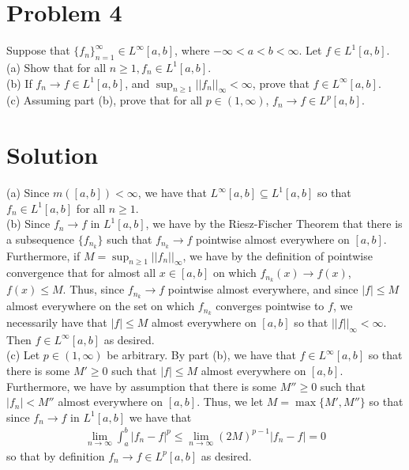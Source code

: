 \documentclass{article}
\begin{document}
\section*{Problem 4}
Suppose that $\{f_n\}_{n=1}^\infty\in L^\infty[a,b]$, where $-\infty<a<b<\infty$. Let $f\in L^1[a,b]$.\\

\noindent (a) Show that for all $n\geq 1, f_n\in L^1[a,b]$.\\

\noindent (b) If $f_n\rightarrow f\in L^1[a,b]$, and $\sup_{n\geq 1}||f_n||_\infty<\infty$, prove that
$f\in L^\infty[a,b]$.\\

\noindent (c) Assuming part (b), prove that for all $p\in(1,\infty)$, $f_n\rightarrow f\in L^p[a,b]$.

\section*{Solution}
(a) Since $m([a,b])<\infty$, we have that $L^\infty[a,b]\subseteq L^1[a,b]$ so that $f_n\in L^1[a,b]$ for all $n\geq 1$.\\

\noindent (b) Since $f_n\rightarrow f$ in $L^1[a,b]$, we have by the Riesz-Fischer Theorem that there is a subsequence $\{f_{n_k}\}$ such that $f_{n_k}\rightarrow f$ pointwise almost everywhere on $[a,b]$.  Furthermore, if $M=\sup_{n\geq 1}||f_n||_\infty$, we have by the definition of pointwise convergence that for almost all $x\in[a,b]$ on which $f_{n_k}(x)\rightarrow f(x)$, $f(x)\leq M$.  Thus, since $f_{n_k}
\rightarrow f$ pointwise almost everywhere, and since $|f|\leq M$ almost everywhere on the set on which $f_{n_k}$ converges pointwise to $f$, we necessarily have that $|f|\leq M$ almost everywhere on $[a,b]$ so that $||f||_\infty<\infty$.  Then $f\in L^\infty[a,b]$ as desired.\\

\noindent (c) Let $p\in(1,\infty)$ be arbitrary.  By part (b), we have that $f\in L^\infty[a,b]$ so that there is some $M'\geq 0$ such that $|f|\leq M$ almost everywhere on $[a,b]$.  Furthermore, we have by assumption that there is some $M''\geq 0$ such that $|f_n|<M''$ almost everywhere on $[a,b]$.  Thus, we let $M=\max\{M',M''\}$ so that since $f_n\rightarrow f$ in $L^1[a,b]$ we have that
\begin{align*}
\lim_{n\rightarrow\infty}\int_a^b|f_n-f|^p\leq\lim_{n\rightarrow\infty}(2M)^{p-1}|f_n-f|=0
\end{align*}
so that by definition $f_n\rightarrow f\in L^p[a,b]$ as desired.
\end{document}
